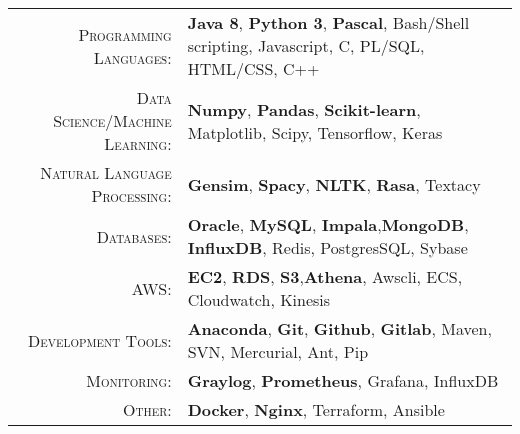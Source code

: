 %
%
%

\renewcommand{\arraystretch}{1.1}
	\begin{tabular}{>{}r>{}p{13cm}} 
		\textsc{Programming Languages:}  		&   \textbf{Java 8}, \textbf{Python 3}, \textbf{Pascal}, Bash/Shell scripting, Javascript, C, PL/SQL,  HTML/CSS, C++\\ 
		\textsc{Data Science/Machine Learning:}                  &   \textbf{Numpy}, \textbf{Pandas}, \textbf{Scikit-learn}, Matplotlib, Scipy, Tensorflow, Keras\\
		\textsc{Natural Language Processing:} 	 & \textbf{Gensim}, \textbf{Spacy}, \textbf{NLTK}, \textbf{Rasa}, Textacy\\
		\textsc{Databases:}                  &   \textbf{Oracle}, \textbf{MySQL}, \textbf{Impala},\textbf{MongoDB}, \textbf{InfluxDB}, Redis, PostgresSQL, Sybase \\ 		
		\textsc{AWS:}                  &   \textbf{EC2}, \textbf{RDS}, \textbf{S3},\textbf{Athena}, Awscli, ECS, Cloudwatch, Kinesis \\ 
		\textsc{Development Tools:} & 	  		\textbf{Anaconda}, \textbf{Git}, \textbf{Github}, \textbf{Gitlab}, Maven, SVN, Mercurial, Ant, Pip \\		
		\textsc{Monitoring:}                  &   \textbf{Graylog}, \textbf{Prometheus}, Grafana, InfluxDB \\ 
		\textsc{Other:}				        &   \textbf{Docker}, \textbf{Nginx}, Terraform, Ansible \\

	\end{tabular}